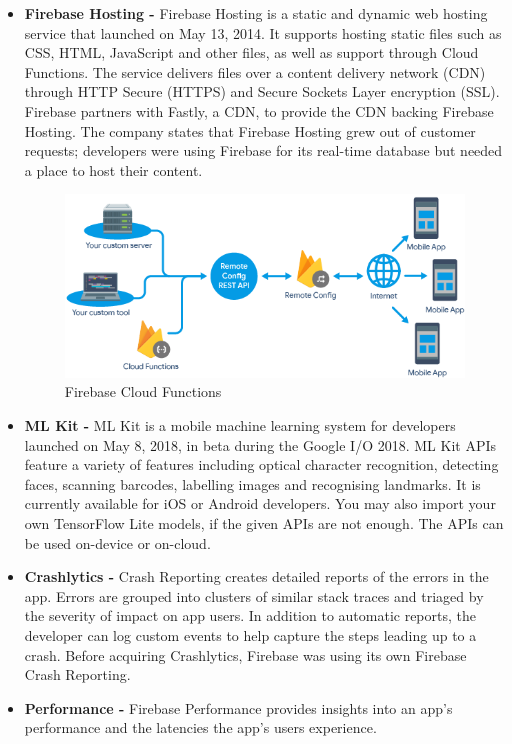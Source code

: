 \documentclass[14pt]{report}
\begin{document}
\begin{itemize}
						\item \textbf{Firebase Hosting - }Firebase Hosting is a static and dynamic web hosting service that launched on May 13, 2014. It supports hosting static files such as CSS, HTML, JavaScript and other files, as well as support through Cloud Functions. The service delivers files over a content delivery network (CDN) through HTTP Secure (HTTPS) and Secure Sockets Layer encryption (SSL). Firebase partners with Fastly, a CDN, to provide the CDN backing Firebase Hosting. The company states that Firebase Hosting grew out of customer requests; developers were using Firebase for its real-time database but needed a place to host their content.
						\begin{figure}[h]
							\includegraphics[width=14cm]{firebaserest.png}
							\centering
							\caption{Firebase Cloud Functions}
						\end{figure}
						\item \textbf{ML Kit - }ML Kit is a mobile machine learning system for developers launched on May 8, 2018, in beta during the Google I/O 2018. ML Kit APIs feature a variety of features including optical character recognition, detecting faces, scanning barcodes, labelling images and recognising landmarks. It is currently available for iOS or Android developers. You may also import your own TensorFlow Lite models, if the given APIs are not enough. The APIs can be used on-device or on-cloud.
						\item \textbf{Crashlytics - }Crash Reporting creates detailed reports of the errors in the app. Errors are grouped into clusters of similar stack traces and triaged by the severity of impact on app users. In addition to automatic reports, the developer can log custom events to help capture the steps leading up to a crash. Before acquiring Crashlytics, Firebase was using its own Firebase Crash Reporting.
						\item \textbf{Performance - }Firebase Performance provides insights into an app's performance and the latencies the app's users experience.

\end{itemize}
\end{document}
